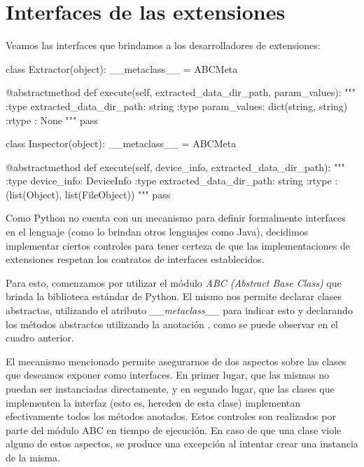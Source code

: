 \section{Interfaces de las extensiones}
Veamos las interfaces que brindamos a los desarrolladores de extensiones:
\newline

\begin{python}[title=Interfaces brindadas a los desarrolladores, captionpos=b]
class Extractor(object):
    __metaclass__ = ABCMeta

    @abstractmethod
    def execute(self, extracted_data_dir_path, param_values):
        """
        :type extracted_data_dir_path: string
        :type param_values: dict(string, string)
        :rtype : None
        """
        pass

class Inspector(object):
    __metaclass__ = ABCMeta

    @abstractmethod
    def execute(self, device_info, extracted_data_dir_path):
        """
        :type device_info: DeviceInfo
        :type extracted_data_dir_path: string
        :rtype : (list(Object), list(FileObject))
        """
        pass

\end{python}

Como Python no cuenta con un mecanismo para definir formalmente interfaces en el lenguaje (como lo brindan otros lenguajes como Java), decidimos implementar ciertos controles para tener certeza de que las implementaciones de extensiones respetan los contratos de interfaces establecidos.

Para esto, comenzamos por utilizar el módulo \emph{ABC (Abstract Base Class)} que brinda la biblioteca estándar de Python. El mismo nos permite declarar clases abstractas, utilizando el atributo \emph{\_\_metaclass\_\_} para indicar esto y declarando los métodos abstractos utilizando la anotación \emph{\@abstractmethod}, como se puede observar en el cuadro anterior.

El mecanismo mencionado permite asegurarnos de dos aspectos sobre las clases que deseamos exponer como interfaces. En primer lugar, que las mismas no puedan ser instanciadas directamente, y en segundo lugar, que las clases que implementen la interfaz (esto es, hereden de esta clase) implementan efectivamente todos los métodos anotados. Estos controles son realizados por parte del módulo ABC en tiempo de ejecución. En caso de que una clase viole alguno de estos aspectos, se produce una excepción al intentar crear una instancia de la misma.

